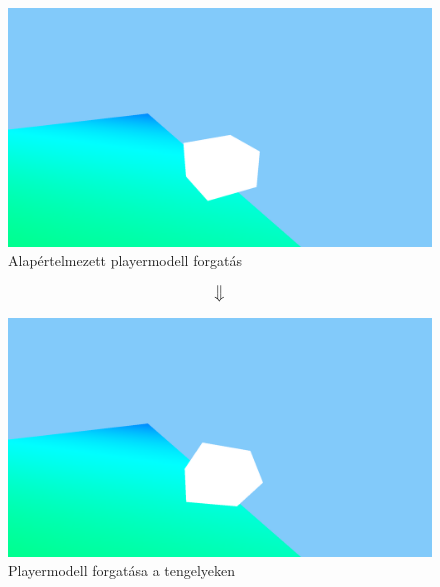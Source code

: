\begin{figure}[h]
	\centering
	\includegraphics[width=13truecm, height=7truecm]{images/modell_4.3.2.1.png}
	\caption{Alapértelmezett playermodell forgatás}
	\label{fig:forgatas_1}
\end{figure}
$$\big\Downarrow$$
\begin{figure}[h]
	\centering
	\includegraphics[width=13truecm, height=7truecm]{images/modell_4.3.2.3.png}
	\caption{Playermodell forgatása a tengelyeken}
	\label{fig:forgatas_2}
\end{figure}






\newpage